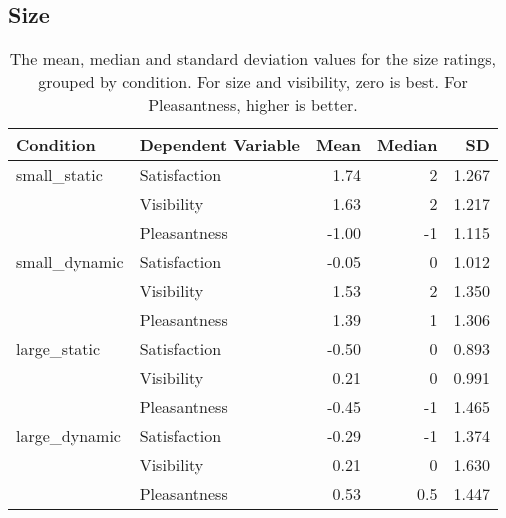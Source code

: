 \subsection{Size}
\begin{table*}[ht]
    \centering
    \caption{The mean, median and standard deviation values for the size ratings, grouped by condition. For size and visibility, zero is best. For Pleasantness, higher is better.}
    \begin{tabular}{llrrr}
    \toprule
    \textbf{Condition} & \textbf{Dependent Variable} & \textbf{Mean} & \textbf{Median} & \textbf{SD} \\
    \midrule
    small\_static      & Satisfaction           & 1.74          & 2               & 1.267       \\
                       & Visibility             & 1.63          & 2               & 1.217       \\
                       & Pleasantness           & -1.00         & -1              & 1.115       \\
    small\_dynamic     & Satisfaction           & -0.05         & 0               & 1.012       \\
                       & Visibility             & 1.53          & 2               & 1.350       \\
                       & Pleasantness           & 1.39          & 1               & 1.306       \\
    large\_static      & Satisfaction           & -0.50         & 0               & 0.893       \\
                       & Visibility             & 0.21          & 0               & 0.991       \\
                       & Pleasantness           & -0.45         & -1              & 1.465       \\
    large\_dynamic     & Satisfaction           & -0.29         & -1              & 1.374       \\
                       & Visibility             & 0.21          & 0               & 1.630       \\
                       & Pleasantness           & 0.53          & 0.5             & 1.447       \\
    \bottomrule
    \end{tabular}
\end{table*}
\clearpage

